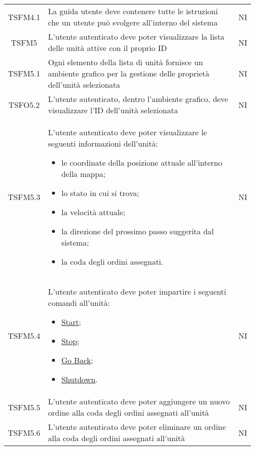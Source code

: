 \begin{longtable}[h!] { c  m{12cm} c}
		TSFM4.1 & La guida utente deve contenere tutte le istruzioni che un utente può svolgere all'interno del sistema & NI \\

		TSFM5   & L'utente autenticato deve poter visualizzare la lista delle unità attive con il proprio ID & NI \\

		TSFM5.1 & Ogni elemento della lista di unità fornisce un ambiente grafico per la gestione delle proprietà dell'unità selezionata & NI \\

		TSFO5.2 & L'utente autenticato, dentro l'ambiente grafico, deve visualizzare l'ID dell'unità selezionata & NI \\

		TSFM5.3 & L'utente autenticato deve poter visualizzare le seguenti informazioni dell'unità:
					\begin{itemize}
						\item le coordinate della posizione attuale all'interno della mappa;
						\item lo stato in cui si trova;
						\item la velocità attuale;
						\item la direzione del prossimo passo suggerita dal sistema;
						\item la coda degli ordini assegnati.
					\end{itemize}
									&NI\\

		TSFM5.4  & L'utente autenticato deve poter impartire i seguenti comandi all'unità:
					\begin{itemize}
						\item \underline{Start};
						\item \underline{Stop};
						\item \underline{Go Back};
						\item \underline{Shutdown}.
					\end{itemize}
									& NI \\

		TSFM5.5  & L'utente autenticato deve poter aggiungere un nuovo ordine alla coda degli ordini assegnati all'unità & NI\\

		TSFM5.6  & L'utente autenticato deve poter eliminare un ordine alla coda degli ordini assegnati all'unità & NI\\


\end{longtable}
